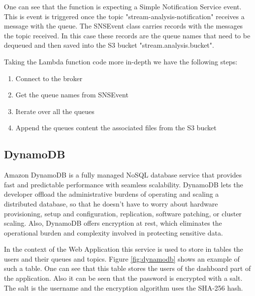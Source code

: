 One can see that the function is expecting a Simple Notification Service event. This is event is triggered once the topic "stream-analysis-notification" receives a message with the queue. The SNSEvent class carries records with the messages the topic received. In this case these records are the queue names that need to be dequeued and then saved into the S3 bucket "stream.analysis.bucket".

Taking the Lambda function code more in-depth we have the following steps:

\begin{enumerate}
	\item Connect to the broker
	\item Get the queue names from SNSEvent
	\item Iterate over all the queues
	\item Append the queues content the associated files from the S3 bucket
\end{enumerate}

\newpage

\subsection{DynamoDB}
\label{chap:04:03:08}

Amazon DynamoDB is a fully managed NoSQL database service that provides fast and predictable performance with seamless scalability. DynamoDB lets the developer offload the administrative burdens of operating and scaling a distributed database, so that he doesn't have to worry about hardware provisioning, setup and configuration, replication, software patching, or cluster scaling. Also, DynamoDB offers encryption at rest, which eliminates the operational burden and complexity involved in protecting sensitive data.\cite{aws-dynamodb} 

In the context of the Web Application this service is used to store in tables the users and their queues and topics. Figure \ref{fig:dynamodb} shows an example of such a table. One can see that this table stores the users of the dashboard part of the application. Also it can be seen that the password is encrypted with a salt. The salt is the username and the encryption algorithm uses the SHA-256 hash.\\

